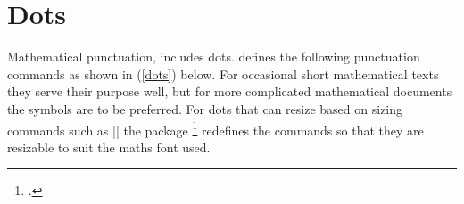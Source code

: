
\section{Dots}

Mathematical punctuation, includes dots. \latexe defines the following punctuation commands as shown in (\ref{dots}) below. For occasional short mathematical texts they serve their purpose well, but for more complicated mathematical documents the \AmS symbols are to be preferred. For dots that can resize based on sizing commands such as |\Large| the package \footcite{mathdots} redefines the commands so that they are resizable to suit the maths font used.

